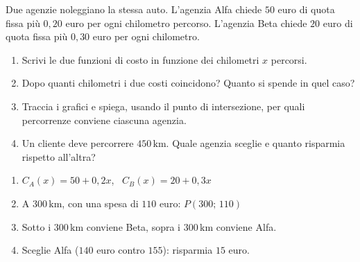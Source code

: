 \begin{question}[ID=4.4, subtitle={Noleggio auto: quale agenzia conviene}, difficulty=difficile, tags={sistemi, break-even, grafici}]
Due agenzie noleggiano la stessa auto. L'agenzia Alfa chiede $50$ euro di quota fissa più $0{,}20$ euro per ogni chilometro percorso. L'agenzia Beta chiede $20$ euro di quota fissa più $0{,}30$ euro per ogni chilometro.
\begin{enumerate}[label=\alph*),leftmargin=1.8cm]
    \item Scrivi le due funzioni di costo in funzione dei chilometri $x$ percorsi.
    \item Dopo quanti chilometri i due costi coincidono? Quanto si spende in quel caso?
    \item Traccia i grafici e spiega, usando il punto di intersezione, per quali percorrenze conviene ciascuna agenzia.
    \item Un cliente deve percorrere $450\,\text{km}$. Quale agenzia sceglie e quanto risparmia rispetto all'altra?
\end{enumerate}
\begin{solution}
\begin{enumerate}[label=\alph*),leftmargin=1.8cm]
    \item $C_A(x)=50+0{,}2x$, \ $C_B(x)=20+0{,}3x$
    \item A $300\,\text{km}$, con una spesa di $110$ euro: $P(300;\,110)$
    \item Sotto i $300\,\text{km}$ conviene Beta, sopra i $300\,\text{km}$ conviene Alfa.
\begin{center}
\end{center}
    \item Sceglie Alfa ($140$ euro contro $155$): risparmia $15$ euro.
\end{enumerate}
\end{solution}
\begin{explanation}
\begin{enumerate}[label=\alph*),leftmargin=1.8cm]

\end{enumerate}
\end{explanation}
\end{question}
